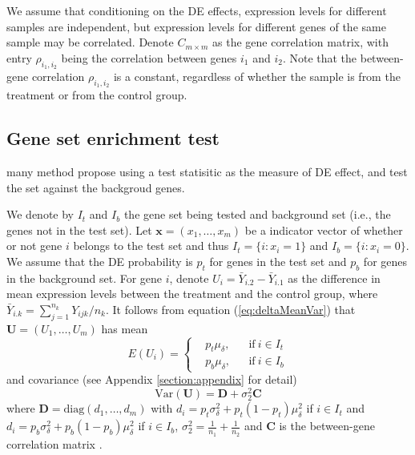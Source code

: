 \documentclass[11pt, a4paper]{article}
\begin{document}
	
	We assume that conditioning on the DE effects, expression levels for different samples are independent, but expression levels for different genes of the same sample may be correlated. Denote $C_{m \times m}$ as the gene correlation matrix, with entry $\rho_{i_1, i_2}$ being the correlation between genes $i_1$ and $i_2$. Note that the between-gene correlation $\rho_{i_1, i_2}$ is a constant, regardless of whether the sample is from the treatment or from the control group. 
	
	\subsection{Gene set enrichment test}\label{subsection:enrichmenttest}
	many method propose using a test statisitic as the measure of DE effect, and test the set against the backgroud genes. 
	
	We denote by $I_t$ and $I_b$ the gene set being tested and background set (i.e., the genes not in the test set).  
	Let $\bm x = (x_1, \ldots, x_m)$ be a indicator vector of whether or not gene $i$ belongs to the test set and thus $I_t = \{i: x_i =1\}$ and $I_b = \{i: x_i =0\}$. We assume that the DE probability is $p_t$ for genes in the test set and $p_b$ for genes in the background set. For gene $i$, denote $U_i=\bar{Y}_{i.2}-\bar{Y}_{i.1}$ as the difference in mean expression levels between the treatment and the control group, where $\bar{Y}_{i.k}= \sum_{j=1}^{n_k}Y_{ijk}/n_k$. It follows from equation (\ref{eq:deltaMeanVar}) that $\bm U = (U_1, \ldots, U_m)$ has mean
	\begin{equation}\label{eq:expectation}
		E(U_i) = \left \{
		\begin{aligned}
			&p_t\mu_{\delta}, && \text{if}\ i \in I_t \\
			&p_b\mu_{\delta}, && \text{if}\ i \in I_b
		\end{aligned} \right.
	\end{equation} 
	and covariance (see Appendix \ref{section:appendix} for detail) 
	\begin{equation}\label{eq:variance}
		\text{Var}(\bm U) = \bm D  + \sigma_2^2\bm C
	\end{equation}
	where $\bm D = \text{diag}(d_1, \ldots, d_m)$ with $d_i = p_t\sigma_{\delta}^2 + p_t(1-p_t)\mu_{\delta}^2$ if $i\in I_t$ and $d_i =p_b\sigma_{\delta}^2 + p_b(1-p_b)\mu_{\delta}^2$ if $i\in I_b$,  $\sigma_2^2 =\frac{1}{n_1} + \frac{1}{n_2} $ and $\bm C$ is the between-gene correlation matrix . 
	
\end{document}
